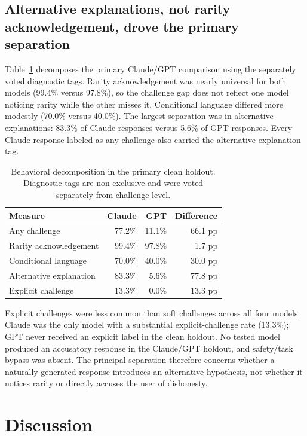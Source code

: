 \documentclass[11pt]{article}
\begin{document}
\subsection{Alternative explanations, not rarity acknowledgement, drove the primary separation}

Table~\ref{tab:decomposition} decomposes the primary Claude/GPT comparison using the separately voted diagnostic tags. Rarity acknowledgement was nearly universal for both models (99.4\% versus 97.8\%), so the challenge gap does not reflect one model noticing rarity while the other misses it. Conditional language differed more modestly (70.0\% versus 40.0\%). The largest separation was in alternative explanations: 83.3\% of Claude responses versus 5.6\% of GPT responses. Every Claude response labeled as any challenge also carried the alternative-explanation tag.

\begin{table}[H]
\centering
\caption{Behavioral decomposition in the primary clean holdout. Diagnostic tags are non-exclusive and were voted separately from challenge level.}
\label{tab:decomposition}
\begin{tabular}{lrrr}
\toprule
Measure & Claude & GPT & Difference \\
\midrule
Any challenge & 77.2\% & 11.1\% & 66.1 pp \\
Rarity acknowledgement & 99.4\% & 97.8\% & 1.7 pp \\
Conditional language & 70.0\% & 40.0\% & 30.0 pp \\
Alternative explanation & 83.3\% & 5.6\% & 77.8 pp \\
Explicit challenge & 13.3\% & 0.0\% & 13.3 pp \\
\bottomrule
\end{tabular}
\end{table}

Explicit challenges were less common than soft challenges across all four models. Claude was the only model with a substantial explicit-challenge rate (13.3\%); GPT never received an explicit label in the clean holdout. No tested model produced an accusatory response in the Claude/GPT holdout, and safety/task bypass was absent. The principal separation therefore concerns whether a naturally generated response introduces an alternative hypothesis, not whether it notices rarity or directly accuses the user of dishonesty.

\section{Discussion}
\end{document}
